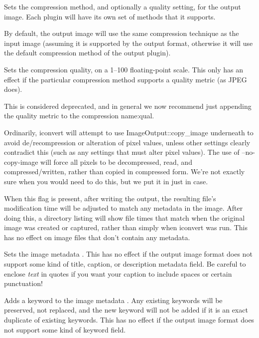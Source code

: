 Sets the compression method, and optionally a quality setting, for the
output image.  Each \ImageOutput plugin will have its own set of methods
that it supports.

By default, the output image will use the same compression technique as
the input image (assuming it is supported by the output format,
otherwise it will use the default compression method of the output
plugin).
\apiend

Sets the compression quality, on a 1--100 floating-point scale.
This only has an effect if the particular compression method supports
a quality metric (as JPEG does).

This is considered deprecated, and in general we now recommend just
appending the quality metric to the {\cf compression name:qual}.
\apiend

Ordinarily, {\cf iconvert} will attempt to use {\cf
  ImageOutput::copy_image}
underneath to avoid de/recompression or alteration of pixel values,
unless other settings clearly contradict this (such as any settings
that must alter pixel values).  The use of {\cf --no-copy-image} will
force all pixels to be decompressed, read, and compressed/written,
rather than copied in compressed form.  We're not exactly sure when
you would need to do this, but we put it in just in case.
\apiend

When this flag is present, after writing the output, the resulting
file's modification time will be adjusted to match any 
metadata in the image.  After doing this, a directory listing will show
file times that match when the original image was created or captured,
rather than simply when {\cf iconvert} was run.  This has no effect on
image files that don't contain any  metadata.
\apiend

Sets the image metadata .
This has no effect if the output image format does not support some kind
of title, caption, or description metadata field.
Be careful to enclose \emph{text} in quotes if you want your caption to
include spaces or certain punctuation!
\apiend

Adds a keyword to the image metadata .  Any existing
keywords will be preserved, not replaced, and the new keyword will not
be added if it is an exact duplicate of existing keywords.  This has no
effect if the output image format does not support some kind of keyword
field.  

